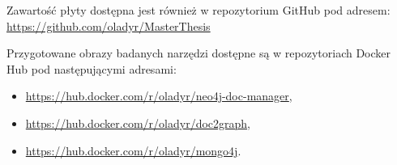 \documentclass[a4paper,twoside,12pt]{book}
\begin{document}
\begin{appendices}
Zawartość płyty dostępna jest również w repozytorium GitHub pod adresem:
\url{https://github.com/oladyr/MasterThesis}

\vspace{0.3cm}

Przygotowane obrazy badanych narzędzi dostępne są w repozytoriach Docker Hub pod następującymi adresami:
\begin{itemize}
\item \url{https://hub.docker.com/r/oladyr/neo4j-doc-manager},
\item \url{https://hub.docker.com/r/oladyr/doc2graph},
\item \url{https://hub.docker.com/r/oladyr/mongo4j}.
\end{itemize}

\makeatletter
\def\@tocrmarg{2.55em plus 3em}
\makeatother
\listoffigures


\renewcommand*{\lstlistlistingname}{Spis listingów}
\lstlistoflistings
	
\end{appendices}
\end{document}
